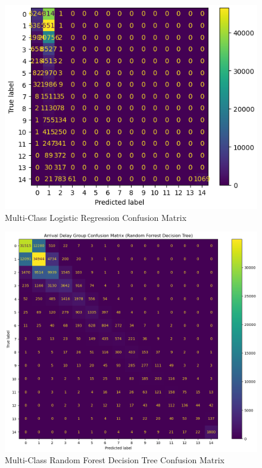 \documentclass[a4paper,12pt]{article}
\begin{document}
\begin{figure}
    \centering
    \includegraphics*[scale=.50]{../../img/model_rq1_cfmtrx_2.png}
    \caption[]{Multi-Class Logistic Regression Confusion Matrix}
    \label{fig:model:rq1:cfmtrx_2}
\end{figure}

\begin{figure}
    \centering
    \includegraphics*[scale=.50]{../../img/model_rq1_cfmtrx_3.png}
    \caption[]{Multi-Class Random Forest Decision Tree Confusion Matrix}
    \label{fig:model:rq1:cfmtrx_3}
\end{figure}
\end{document}
